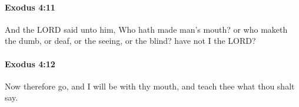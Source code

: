 		\paragraph{Exodus 4:11} %
			\label{EXODUS-4-11}

			And the LORD said unto him, Who hath made man's mouth? or who maketh the dumb, or deaf, or the seeing, or the blind? have not I the LORD?


		\paragraph{Exodus 4:12} %
			\label{EXODUS-4-12}

			Now therefore go, and I will be with thy mouth, and teach thee what thou shalt say.


